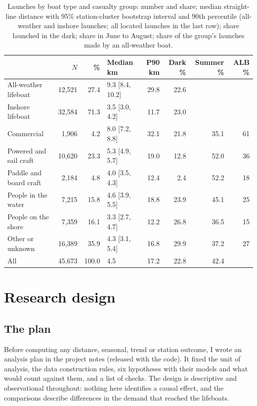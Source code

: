 \documentclass[11pt,a4paper]{article}
\begin{document}
\begin{table}[tbp]\centering\small\caption{Launches by boat type and casualty group: number and share; median straight-line distance with 95\% station-cluster bootstrap interval and 90th percentile (all-weather and inshore launches; all located launches in the last row); share launched in the dark; share in June to August; share of the group's launches made by an all-weather boat.}\label{tab:desc}\setlength{\tabcolsep}{4pt}\begin{tabular}{lrrlrrrr}\toprule & $N$ & \% & Median km & P90 km & Dark \% & Summer \% & ALB \%\\\midrule
All-weather lifeboat & 12,521 & 27.4 & 9.3 [8.4, 10.2] & 29.8 & 22.6 & & \\
Inshore lifeboat & 32,584 & 71.3 & 3.5 [3.0, 4.2] & 11.7 & 23.0 & & \\
\midrule
Commercial & 1,906 & 4.2 & 8.0 [7.2, 8.8] & 32.1 & 21.8 & 35.1 & 61\\
Powered and sail craft & 10,620 & 23.3 & 5.3 [4.9, 5.7] & 19.0 & 12.8 & 52.0 & 36\\
Paddle and board craft & 2,184 & 4.8 & 4.0 [3.5, 4.3] & 12.4 & 2.4 & 52.2 & 18\\
People in the water & 7,215 & 15.8 & 4.6 [3.9, 5.5] & 18.8 & 23.9 & 45.1 & 25\\
People on the shore & 7,359 & 16.1 & 3.3 [2.7, 4.7] & 12.2 & 26.8 & 36.5 & 15\\
Other or unknown & 16,389 & 35.9 & 4.3 [3.1, 5.4] & 16.8 & 29.9 & 37.2 & 27\\
\midrule All & 45,673 & 100.0 & 4.5 & 17.2 & 22.8 & 42.4 & \\
\bottomrule\end{tabular}\end{table}

\section{Research design}\label{sec:design}
\subsection{The plan}
Before computing any distance, seasonal, trend or station outcome, I wrote an analysis plan in the project notes (released with the code). It fixed the unit of analysis, the data construction rules, six hypotheses with their models and what would count against them, and a list of checks. The design is descriptive and observational throughout: nothing here identifies a causal effect, and the comparisons describe differences in the demand that reached the lifeboats.
\end{document}
